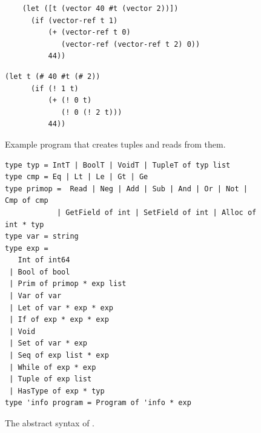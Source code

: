 \documentclass[11pt]{book}
\newcommand{\gray}[1]{{\color{gray} #1}}
\newcommand{\ocaml}[1]{{\color{blue}{#1}}}
\begin{document}
{\begin{figure}[tbp]
\begin{lstlisting}
    (let ([t (vector 40 #t (vector 2))])
      (if (vector-ref t 1)
          (+ (vector-ref t 0)
             (vector-ref (vector-ref t 2) 0))
          44))
\end{lstlisting}
\begin{lstlisting}[style=ocaml]
    (let t (# 40 #t (# 2))
      (if (! 1 t)
          (+ (! 0 t)
             (! 0 (! 2 t)))
          44))
\end{lstlisting}
\caption{Example program that creates tuples and reads from them.}
\label{fig:vector-eg}
\end{figure}

\begin{figure}[tp]
\centering
\fbox{
\begin{minipage}{0.96\textwidth}
\[
\begin{array}{lcl}
  \itm{op} &::=& \ldots \mid \code{vector} \mid \code{vector-length} \\
\Exp &::=& \gray{ \INT{\Int} \mid \VAR{\Var} \mid \LET{\Var}{\Exp}{\Exp} } \\
     &\mid& \gray{ \PRIM{\itm{op}}{\Exp\ldots}
      \mid \BOOL{\itm{bool}}
      \mid \IF{\Exp}{\Exp}{\Exp} } \\
    &\mid& \VECREF{\Exp}{\INT{\Int}}\\
    &\mid& \VECSET{\Exp}{\INT{\Int}}{\Exp} \\
     &\mid& \VOID{} \mid \LP\key{HasType}~\Exp~\Type \RP \\
  \LangVec{} &::=& \PROGRAM{\key{'()}}{\Exp}
\end{array}
\]
\end{minipage}
}
\begin{lstlisting}[style=ocaml,frame=single]
type typ = IntT | BoolT | VoidT | TupleT of typ list
type cmp = Eq | Lt | Le | Gt | Ge 
type primop =  Read | Neg | Add | Sub | And | Or | Not | Cmp of cmp
            | GetField of int | SetField of int | Alloc of int * typ
type var = string
type exp = 
   Int of int64  
 | Bool of bool
 | Prim of primop * exp list
 | Var of var
 | Let of var * exp * exp
 | If of exp * exp * exp 
 | Void
 | Set of var * exp
 | Seq of exp list * exp
 | While of exp * exp
 | Tuple of exp list
 | HasType of exp * typ
type 'info program = Program of 'info * exp
\end{lstlisting}
\caption{The abstract syntax of \LangVec{} \ocaml{\LangTuple{}}.}
\label{fig:Rvec-syntax}
\end{figure}

}
\end{document}
